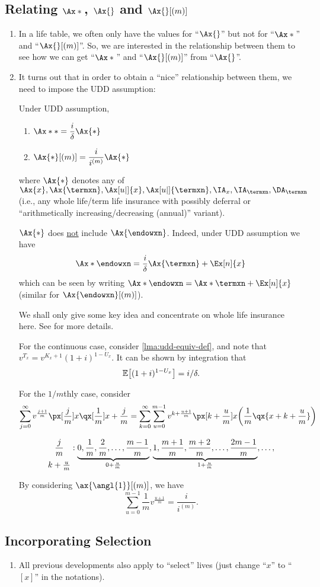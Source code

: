 \subsection{Relating \(\Ax*{}\), \(\Ax{}\) and \(\Ax{}[(m)]\)}
\begin{enumerate}
\item In a life table, we often only have the values for ``\(\Ax{}\)'' but not for
``\(\Ax*{}\)'' and ``\(\Ax{}[(m)]\)''. So, we are interested in the
relationship between them to see how we can get ``\(\Ax*{}\)'' and ``\(\Ax{}[(m)]\)''
from ``\(\Ax{}\)''.
\item It turns out that in order to obtain a ``nice'' relationship between them, we
need to impose the UDD assumption:
\begin{proposition}
\label{prp:udd-relate-insurance-apvs}
Under UDD assumption,
\begin{enumerate}
\item \(\displaystyle\Ax*{*}=\frac{i}{\delta}\Ax{*}\)
\item \(\displaystyle\Ax{*}[(m)]=\frac{i}{i^{(m)}}\Ax{*}\)
\end{enumerate}
where \(\Ax{*}\) denotes any of \(\Ax{x},\Ax{\termxn}, \Ax[u|]{x}, \Ax[u|]{\termxn}, \IA_x,
\IA_{\termxn}, \DA_{\termxn}\) (i.e., any whole life/term life insurance with
possibly deferral or ``arithmetically increasing/decreasing (annual)''
variant).
\end{proposition}
\begin{warning}
\(\Ax{*}\) does \underline{not} include \(\Ax{\endowxn}\). Indeed, under UDD
assumption we have
\[
\Ax*{\endowxn}=\frac{i}{\delta}\Ax{\termxn}+\Ex[n]{x}
\]
which can be seen by writing \(\Ax*{\endowxn}=\Ax*{\termxn}+\Ex[n]{x}\)
(similar for \(\Ax{\endowxn}[(m)]\)).
\end{warning}

\begin{pf}
We shall only give some key idea and concentrate on whole life insurance
here. See \textcite[Section~4.4]{bowers1997actuarial} for more details.

For the continuous case, consider \cref{lma:udd-equiv-def}, and note that
\(v^{T_x}=v^{K_x+1}(1+i)^{1-U_x}\). It can be shown by integration that
\[\mathbb{E}\qty[(1+i)^{1-U_x}]=i/\delta.\]

For the \(1/m\)thly case, consider
\[
\sum_{j=0}^{\infty}v^{\frac{j+1}{m}}\px[\frac{j}{m}]{x}\qx[\frac{1}{m}]{x+\frac{j}{m}}
=\sum_{k=0}^{\infty}\sum_{u=0}^{m-1}v^{k+\frac{u+1}{m}}\px[k+\frac{u}{m}]{x}\qty(\frac{1}{m}\qx{x+k+\frac{u}{m}})
\]
\begin{intuition}
\[
\stackunder[7pt]{\(\displaystyle \frac{j}{m}\)}{\(k+\frac{u}{m}\)}:\underbrace{0,\frac{1}{m},\frac{2}{m},\dotsc,\frac{m-1}{m}}_{0+\frac{u}{m}},
\underbrace{1,\frac{m+1}{m},\frac{m+2}{m},\dotsc,\frac{2m-1}{m}}_{1+\frac{u}{m}}
,\dotsc,
\]
\end{intuition}

By considering \(\ax{\angl{1}}[(m)]\), we have
\[
\sum_{u=0}^{m-1}\frac{1}{m}v^{\frac{u+1}{m}}=\frac{i}{i^{(m)}}.
\]
\end{pf}
\end{enumerate}
\subsection{Incorporating Selection}
\begin{enumerate}
\item All previous developments also apply to ``select'' lives (just change
``\(x\)'' to ``\([x]\)'' in the notations).
\end{enumerate}
